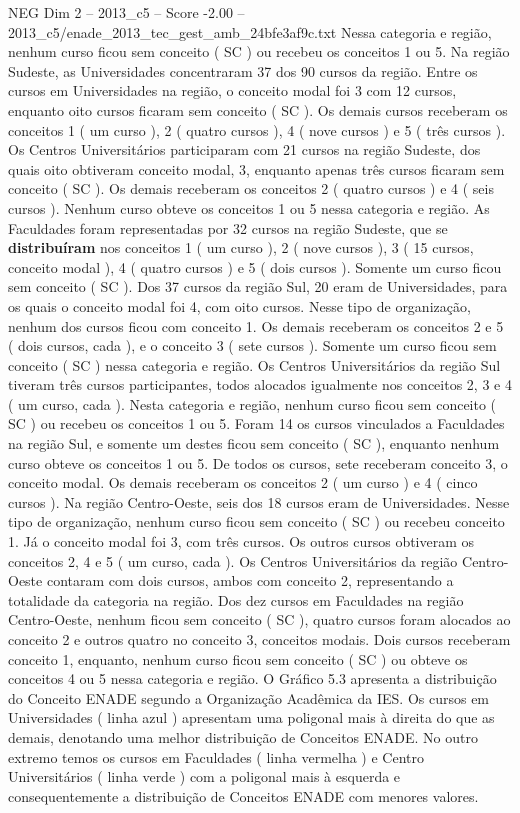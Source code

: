 \begin{textsample}{NEG Dim 2 – 2013\_c5 – Score -2.00 – 2013\_c5/enade\_2013\_tec\_gest\_amb\_24bfe3af9c.txt}
Nessa categoria e região, nenhum curso ficou sem conceito ( SC ) ou recebeu os conceitos 1 ou 5.
Na região Sudeste, as Universidades concentraram 37 dos 90 cursos da região.
Entre os cursos em Universidades na região, o conceito modal foi 3 com 12 cursos, enquanto oito cursos ficaram sem conceito ( SC ).
Os demais cursos receberam os conceitos 1 ( um curso ), 2 ( quatro cursos ), 4 ( nove cursos ) e 5 ( três cursos ).
Os Centros Universitários participaram com 21 cursos na região Sudeste, dos quais oito obtiveram conceito modal, 3, enquanto apenas três cursos ficaram sem conceito ( SC ).
Os demais receberam os conceitos 2 ( quatro cursos ) e 4 ( seis cursos ).
Nenhum curso obteve os conceitos 1 ou 5 nessa categoria e região.
As Faculdades foram representadas por 32 cursos na região Sudeste, que se \textbf{distribuíram} nos conceitos 1 ( um curso ), 2 ( nove cursos ), 3 ( 15 cursos, conceito modal ), 4 ( quatro cursos ) e 5 ( dois cursos ).
Somente um curso ficou sem conceito ( SC ).
Dos 37 cursos da região Sul, 20 eram de Universidades, para os quais o conceito modal foi 4, com oito cursos.
Nesse tipo de organização, nenhum dos cursos ficou com conceito 1.
Os demais receberam os conceitos 2 e 5 ( dois cursos, cada ), e o conceito 3 ( sete cursos ).
Somente um curso ficou sem conceito ( SC ) nessa categoria e região.
Os Centros Universitários da região Sul tiveram três cursos participantes, todos alocados igualmente nos conceitos 2, 3 e 4 ( um curso, cada ).
Nesta categoria e região, nenhum curso ficou sem conceito ( SC ) ou recebeu os conceitos 1 ou 5.
Foram 14 os cursos vinculados a Faculdades na região Sul, e somente um destes ficou sem conceito ( SC ), enquanto nenhum curso obteve os conceitos 1 ou 5.
De todos os cursos, sete receberam conceito 3, o conceito modal.
Os demais receberam os conceitos 2 ( um curso ) e 4 ( cinco cursos ).
Na região Centro-Oeste, seis dos 18 cursos eram de Universidades.
Nesse tipo de organização, nenhum curso ficou sem conceito ( SC ) ou recebeu conceito 1.
Já o conceito modal foi 3, com três cursos.
Os outros cursos obtiveram os conceitos 2, 4 e 5 ( um curso, cada ).
Os Centros Universitários da região Centro-Oeste contaram com dois cursos, ambos com conceito 2, representando a totalidade da categoria na região.
Dos dez cursos em Faculdades na região Centro-Oeste, nenhum ficou sem conceito ( SC ), quatro cursos foram alocados ao conceito 2 e outros quatro no conceito 3, conceitos modais.
Dois cursos receberam conceito 1, enquanto, nenhum curso ficou sem conceito ( SC ) ou obteve os conceitos 4 ou 5 nessa categoria e região.
O Gráfico 5.3 apresenta a distribuição do Conceito ENADE segundo a Organização Acadêmica da IES.
Os cursos em Universidades ( linha azul ) apresentam uma poligonal mais à direita do que as demais, denotando uma melhor distribuição de Conceitos ENADE.
No outro extremo temos os cursos em Faculdades ( linha vermelha ) e Centro Universitários ( linha verde ) com a poligonal mais à esquerda e consequentemente a distribuição de Conceitos ENADE com menores valores.

\end{textsample}
